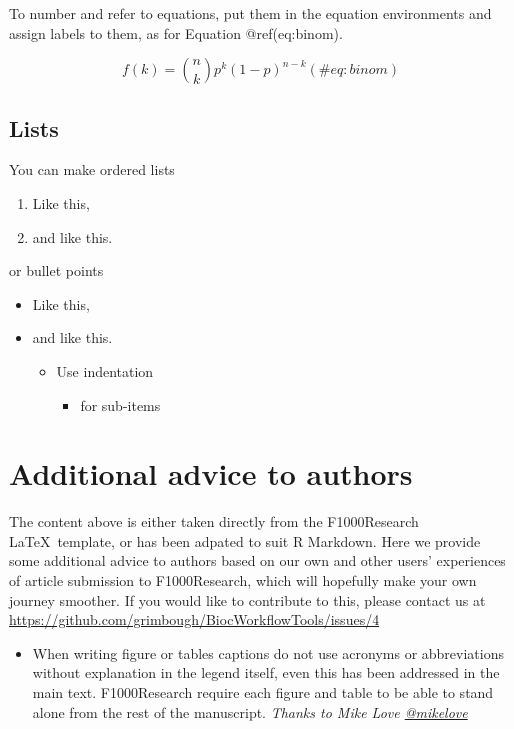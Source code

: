 \documentclass[9pt,a4paper,]{extarticle}
\begin{document}
To number and refer to equations, put them in the equation environments and assign labels to them, as for Equation @ref(eq:binom).

\begin{equation}
  f\left(k\right) = \binom{n}{k} p^k\left(1-p\right)^{n-k}
  (\#eq:binom)
\end{equation}

\hypertarget{lists}{%
\subsection{Lists}\label{lists}}

You can make ordered lists

\begin{enumerate}
\def\labelenumi{\arabic{enumi}.}
\tightlist
\item
  Like this,
\item
  and like this.
\end{enumerate}

or bullet points

\begin{itemize}
\tightlist
\item
  Like this,
\item
  and like this.

  \begin{itemize}
  \tightlist
  \item
    Use indentation

    \begin{itemize}
    \tightlist
    \item
      for sub-items
    \end{itemize}
  \end{itemize}
\end{itemize}

\hypertarget{additional-advice-to-authors}{%
\section{Additional advice to authors}\label{additional-advice-to-authors}}

The content above is either taken directly from the F1000Research \LaTeX~template, or has been adpated to suit R Markdown. Here we provide some additional advice to authors based on our own and other users' experiences of article submission to F1000Research, which will hopefully make your own journey smoother. If you would like to contribute to this, please contact us at \url{https://github.com/grimbough/BiocWorkflowTools/issues/4}

\begin{itemize}
\tightlist
\item
  When writing figure or tables captions do not use acronyms or abbreviations without explanation in the legend itself, even this has been addressed in the main text. F1000Research require each figure and table to be able to stand alone from the rest of the manuscript. \emph{Thanks to Mike Love \href{https://twitter.com/mikelove}{@mikelove}}
\end{itemize}

{\small}
\end{document}
